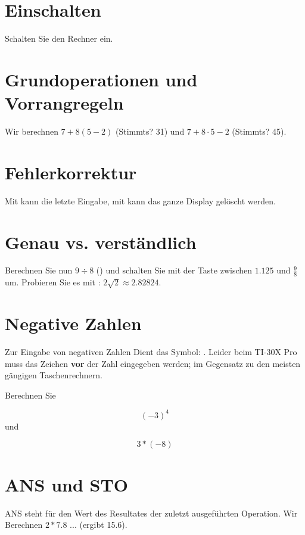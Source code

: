 

\renewcommand{\metaHeaderLine}{Arbeitsblatt}
\renewcommand{\arbeitsblattTitel}{Taschenrechner TI-30 Pro/Plus MathPrint
--- Einführung}

\arbeitsblattHeader{}

\section{Einschalten}
Schalten Sie den Rechner ein. 


\section{Grundoperationen und Vorrangregeln}
Wir berechnen $7 + 8(5-2)$  (Stimmts? 31) und $7 + 8\cdot 5 - 2$ (Stimmts? 45).

\section{Fehlerkorrektur}
Mit  kann die letzte Eingabe, mit 
kann das ganze Display gelöscht werden.

\section{Genau vs. verständlich}
Berechnen Sie nun $9 \div 8$ () und schalten Sie mit der
Taste  zwischen $1.125$ und $\frac{9}{8}$ um.
Probieren Sie es mit    :
$2\sqrt{2} \approx 2.82824$. 

\section{Negative Zahlen}
Zur Eingabe von negativen Zahlen Dient das
Symbol: . Leider beim TI-30X Pro muss das
Zeichen \textbf{vor} der Zahl eingegeben werden; im Gegensatz zu den
meisten gängigen Taschenrechnern.

Berechnen Sie

$$(-3)^4$$
und

$$3* (-8)$$
\newpage


\section{ANS und STO}
ANS steht für den Wert des
Resultates der zuletzt ausgeführten Operation. Wir Berechnen $2 * 7.8$ ... (ergibt 15.6).

